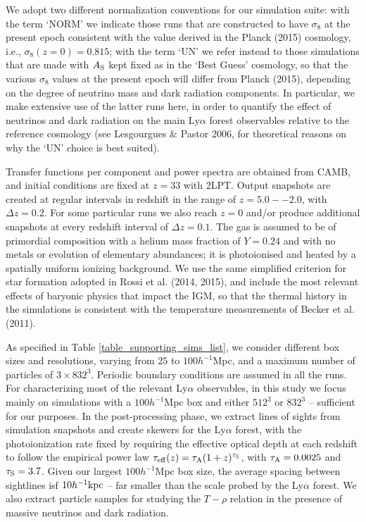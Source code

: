 \documentclass{emulateapj}
\begin{document}
We adopt two different normalization conventions for our simulation suite:
with the term `NORM' we indicate those runs that are constructed to have $\sigma_8$ at the present epoch consistent with
the value derived in the Planck (2015) cosmology, i.e., $\sigma_8(z=0) =0.815$;  with the term `UN' we
refer instead to those simulations that are made with $A_{\rm S}$ kept fixed as in the `Best Guess' cosmology, so 
that the various $\sigma_8$ values at the present epoch  will differ from Planck (2015), depending on the degree of neutrino mass and dark radiation components.
In particular, we make extensive use of the latter runs here, in order to quantify the effect of  neutrinos and dark radiation on the main Ly$\alpha$ forest observables relative to the
reference cosmology (see Lesgourgues \& Pastor 2006, for theoretical reasons on why the `UN' choice is best suited). 

Transfer functions per component and power spectra  are obtained from CAMB, and initial conditions are fixed at $z = 33$ with  2LPT.
Output snapshots are created at regular intervals in redshift in the range of $z = 5.0--2.0$, with $\Delta z = 0.2$. 
For some particular runs we also reach $z=0$ and/or  produce additional snapshots at every redshift interval of $\Delta z = 0.1$. 
The gas is assumed to be of primordial composition with a helium mass fraction of $Y = 0.24$ and with no metals or evolution of elementary abundances; it is
photoionised and heated by a spatially uniform ionizing
background. We use the same simplified criterion for star formation adopted in Rossi et al. (2014, 2015), and 
include the most relevant effects of baryonic physics that impact the IGM, 
so that  the thermal history in the simulations is consistent with the temperature measurements of Becker et al. (2011). 
 
As specified in Table \ref{table_supporting_sims_list}, we consider different box sizes and resolutions, varying from $25$ to $100h^{-1}$Mpc, and
a maximum number of particles of $3 \times 832^3$. Periodic boundary conditions are assumed in all the runs. 
For characterizing most of the relevant Ly$\alpha$ observables, in this study
we focus mainly on simulations with a $100h^{-1}$Mpc box and either $512^3$ or $832^3$ -- sufficient for our purposes.
In the post-processing phase, we extract lines of sights from simulation snapshots and create skewers for the Ly$\alpha$ forest, with
the photoionization rate  fixed by requiring the effective optical depth at each redshift to follow the 
empirical power law 
$\tau_{\rm eff}(z) = \tau_{\rm A}(1 + z)^{\tau_{\rm S}}$, with $\tau_{\rm A} = 0.0025$ and $\tau_{\rm S} = 3.7$.
Given our largest $100 h^{-1}$Mpc box size,
the average spacing between sightlines isf $10 h^{-1}{\rm kpc}$ -- far smaller than the scale probed by the Ly$\alpha$ forest. 
We also extract particle samples for studying the
$T-\rho$ relation in the presence of massive neutrinos and dark radiation. 
 
\end{document}
